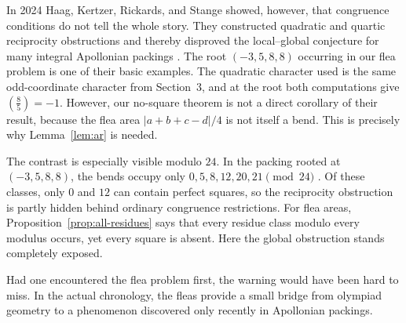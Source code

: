 \documentclass[12pt]{article}
\theoremstyle{definition}
\theoremstyle{remark}
\newcommand{\symb}[2]{\left(\frac{#1}{#2}\right)}
\begin{document}
In 2024 Haag, Kertzer, Rickards, and Stange showed, however, that congruence conditions do not tell the whole story. They constructed quadratic and quartic reciprocity obstructions and thereby disproved the local--global conjecture for many integral Apollonian packings
\cite{HKRS}. The root $(-3,5,8,8)$ occurring in our flea problem is one of their basic
examples. The quadratic character used is the same
odd-coordinate character from Section~3, and at the root both
computations give $\symb{8}{5}=-1$. However, our no-square theorem is not a direct corollary of their result, because the flea area $|a+b+c-d|/4$ is not itself a bend. This is precisely why Lemma~\ref{lem:ar} is needed.

The contrast is especially visible modulo $24$. In the packing rooted at
$(-3,5,8,8)$, the bends occupy only $0,5,8,12,20,21\pmod{24}$
\cite{HKRS}. Of these classes, only $0$ and $12$ can contain perfect squares,
so the reciprocity obstruction is partly hidden behind ordinary congruence
restrictions. For flea areas, Proposition~\ref{prop:all-residues} says that
every residue class modulo every modulus occurs, yet every square is absent.
Here the global obstruction stands completely exposed.

Had one encountered the flea problem first, the warning would have been hard
to miss. In the actual chronology, the fleas provide a small bridge from
olympiad geometry to a phenomenon discovered only recently in Apollonian
packings.
\end{document}
